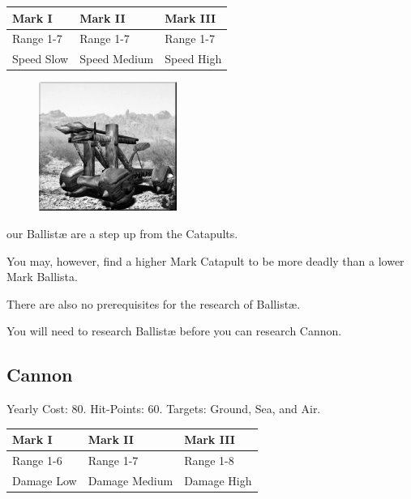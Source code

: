 \begin{tabular}{ | p{1.3in} | p{1.3in} | p{1.3in} |}
	\hline
	\textbf{Mark I}	& \textbf{Mark II} & \textbf{Mark III} \\ \hline
	Range 1-7	& Range 1-7& Range 1-7 \\ \hline
	Speed Slow	& Speed Medium & Speed High \\ \hline
\end{tabular}

\begin{figure}
	\vspace{-20pt}
	\begin{center}
		\includegraphics[width=0.4\textwidth]{Aballista}
	\end{center}
\end{figure}

our Ballistæ are a step up from the Catapults.

You may, however, find a higher Mark Catapult to be more deadly than a lower Mark Ballista.

There are also no prerequisites for the research of Ballistæ.

You will need to research Ballistæ before you can research Cannon.

\clearpage

\subsection{Cannon}


\begin{center}
	Yearly Cost: 80. Hit-Points: 60. Targets: Ground, Sea, and Air.
\end{center}

\begin{tabular}{ | p{1.3in} | p{1.3in} | p{1.3in} |}
	\hline
	\textbf{Mark I}	& \textbf{Mark II} & \textbf{Mark III} \\ \hline
	Range 1-6	& Range 1-7 & Range 1-8 \\ \hline
	Damage Low	& Damage Medium & Damage High \\ \hline
\end{tabular}
   

